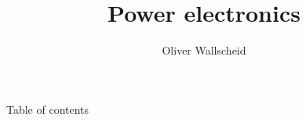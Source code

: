 \documentclass{../course_template/lectureClass}
\title[Power electronics]{Power electronics}
\author{Oliver Wallscheid}
\date{}
\begin{document}

\begin{frame}[plain]
    \titlepage
\end{frame}

\begin{frame}{Table of contents}
    \tableofcontents[hideallsubsections]
\end{frame}





\end{document}
